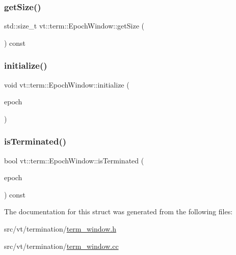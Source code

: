 \subsubsection{\texorpdfstring{get\+Size()}{getSize()}}
{\footnotesize\ttfamily std\+::size\+\_\+t vt\+::term\+::\+Epoch\+Window\+::get\+Size (\begin{DoxyParamCaption}{ }\end{DoxyParamCaption}) const\hspace{0.3cm}{\ttfamily [inline]}}

\mbox{\label{structvt_1_1term_1_1_epoch_window_a2c55839ab883365d71d1de785744df9e}} 
\subsubsection{\texorpdfstring{initialize()}{initialize()}}
{\footnotesize\ttfamily void vt\+::term\+::\+Epoch\+Window\+::initialize (\begin{DoxyParamCaption}\item[{\hyperlink{namespacevt_a985a5adf291c34a3ca263b3378388236}{Epoch\+Type} const \&}]{epoch }\end{DoxyParamCaption})}

\mbox{\label{structvt_1_1term_1_1_epoch_window_a9617344ff1e04ab54dd4a414ac42c349}} 
\subsubsection{\texorpdfstring{is\+Terminated()}{isTerminated()}}
{\footnotesize\ttfamily bool vt\+::term\+::\+Epoch\+Window\+::is\+Terminated (\begin{DoxyParamCaption}\item[{\hyperlink{namespacevt_a985a5adf291c34a3ca263b3378388236}{Epoch\+Type} const \&}]{epoch }\end{DoxyParamCaption}) const}



The documentation for this struct was generated from the following files\+:\begin{DoxyCompactItemize}
\item 
src/vt/termination/\hyperlink{term__window_8h}{term\+\_\+window.\+h}\item 
src/vt/termination/\hyperlink{term__window_8cc}{term\+\_\+window.\+cc}\end{DoxyCompactItemize}

